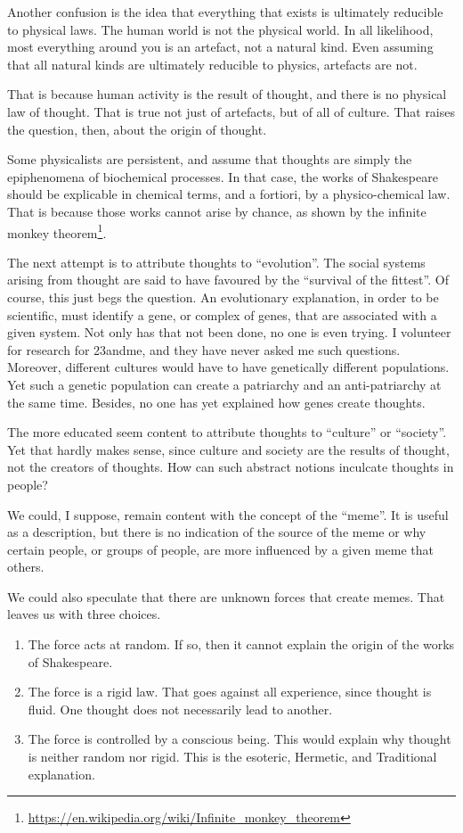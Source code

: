 Another confusion is the idea that everything that exists is ultimately reducible to physical laws. The human world is
not the physical world. In all likelihood, most everything around you is an artefact, not a natural kind. Even assuming
that all natural kinds are ultimately reducible to physics, artefacts are not.

That is because human activity is the result of thought, and there is no physical law of thought. That is true not just
of artefacts, but of all of culture. That raises the question, then, about the origin of thought.

Some physicalists are persistent, and assume that thoughts are simply the epiphenomena of biochemical processes. In that
case, the works of Shakespeare should be explicable in chemical terms, and a fortiori, by a physico-chemical law. That
is because those works cannot arise by chance, as shown by the infinite monkey theorem\footnote{\url{https://en.wikipedia.org/wiki/Infinite_monkey_theorem}}.

The next attempt is to attribute thoughts to “evolution”. The social systems arising from thought are said to have
favoured by the “survival of the fittest”. Of course, this just begs the question. An evolutionary explanation, in
order to be scientific, must identify a gene, or complex of genes, that are associated with a given system. Not only
has that not been done, no one is even trying. I volunteer for research for 23andme, and they have never asked me such
questions. Moreover, different cultures would have to have genetically different populations. Yet such a genetic
population can create a patriarchy and an anti-patriarchy at the same time. Besides, no one has yet explained how genes
create thoughts.

The more educated seem content to attribute thoughts to “culture” or “society”. Yet that hardly makes sense, since
culture and society are the results of thought, not the creators of thoughts. How can such abstract notions inculcate
thoughts in people?

We could, I suppose, remain content with the concept of the “meme”. It is useful as a description, but there is no
indication of the source of the meme or why certain people, or groups of people, are more influenced by a given meme
that others.

We could also speculate that there are unknown forces that create memes. That leaves us with three choices.

\begin{enumerate}
\item The force acts at random. If so, then it cannot explain the origin of the works of Shakespeare. 
\item The force is a rigid law. That goes against all experience, since thought is fluid. One thought does not
necessarily lead to another. 
\item The force is controlled by a conscious being. This would explain why thought is neither random nor rigid. This is
the esoteric, Hermetic, and Traditional explanation. 
\end{enumerate}
